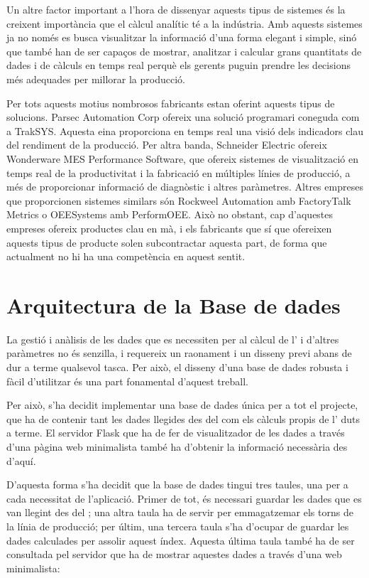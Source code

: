 \documentclass{tfgitic}[2022/06/30]
\begin{document}
Un altre factor important a l'hora de dissenyar aquests tipus de sistemes és la creixent importància que el càlcul analític té a la indústria. Amb aquests sistemes ja no només es busca visualitzar la informació d'una forma elegant i simple, sinó que també han de ser capaços de mostrar, analitzar i calcular grans quantitats de dades i de càlculs en temps real perquè els gerents puguin prendre les decisions més adequades per millorar la producció.

Per tots aquests motius nombrosos fabricants estan oferint aquests tipus de solucions. Parsec Automation Corp ofereix una solució programari coneguda com a TrakSYS. Aquesta eina proporciona en temps real una visió dels indicadors clau del rendiment de la producció. Per altra banda, Schneider Electric ofereix Wonderware MES Performance Software, que ofereix sistemes de visualització en temps real de la productivitat i la fabricació en múltiples línies de producció, a més de proporcionar informació de diagnòstic i altres paràmetres. Altres empreses que proporcionen sistemes similars són Rockweel Automation amb FactoryTalk Metrics o OEESystems amb PerformOEE. Això no obstant, cap d'aquestes empreses ofereix productes clau en mà, i els fabricants que sí que ofereixen aquests tipus de producte solen subcontractar aquesta part, de forma que actualment no hi ha una competència en aquest sentit.

\chapter{Arquitectura de la Base de dades}
\label{chapter:database}
La gestió i anàlisis de les dades que es necessiten per al càlcul de l' i d'altres paràmetres no és senzilla, i requereix un raonament i un disseny previ abans de dur a terme qualsevol tasca. Per això, el disseny d'una base de dades robusta i fàcil d'utilitzar és una part fonamental d'aquest treball.

Per això, s'ha decidit implementar una base de dades única per a tot el projecte, que ha de contenir tant les dades llegides des del  com els càlculs propis de l' duts a terme. El servidor Flask que ha de fer de visualitzador de les dades a través d'una pàgina web minimalista també ha d'obtenir la informació necessària des d'aquí.

D'aquesta forma s'ha decidit que la base de dades tingui tres taules, una per a cada necessitat de l'aplicació. Primer de tot, és necessari guardar les dades que es van llegint des del ; una altra taula ha de servir per emmagatzemar els torns de la línia de producció; per últim, una tercera taula s'ha d'ocupar de guardar les dades calculades per assolir aquest índex. Aquesta última taula també ha de ser consultada pel servidor que ha de mostrar aquestes dades a través d'una web minimalista:
\end{document}
